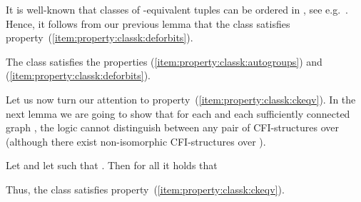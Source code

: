 \documentclass[a4paper,UKenglish]{lipics}
\theoremstyle{plain}
\begin{document}
\medskip
It is well-known that classes of -equivalent tuples 
can be ordered in , see e.g.\ \cite{Ot97}.
Hence, it follows from our previous lemma that the class  satisfies 
property~(\ref{item:property:classk:deforbits}). 

\begin{lemma} \label{lemma:slv:classk:prop:12}
The class  satisfies the properties
(\ref{item:property:classk:autogroups}) and
(\ref{item:property:classk:deforbits}).
\end{lemma}


\medskip
Let us now turn our attention to 
property~(\ref{item:property:classk:ckeqv}).
In the next lemma we are going to show that for each  and each
sufficiently connected graph , the logic  cannot 
distinguish between any pair of CFI-structures over  (although there 
exist non-isomorphic CFI-structures over ).
\begin{lemma} \label{lemma:slv:classk:prop:4}
 Let  and let  such that .
 Then for all  it holds that
 
 Thus, the class  satisfies 
property~(\ref{item:property:classk:ckeqv}).
\end{lemma}
\end{document}
